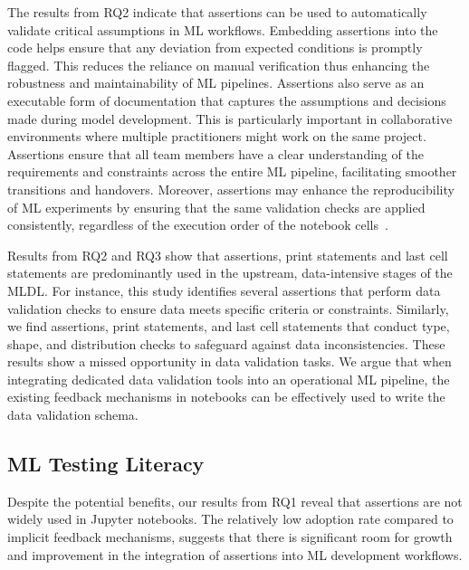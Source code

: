 \documentclass[smallextended]{svjour3}       %
\begin{document}
The results from RQ2 indicate that assertions can be used to automatically validate critical assumptions in ML workflows. Embedding assertions into the code helps ensure that any deviation from expected conditions is promptly flagged. This reduces the reliance on manual verification thus enhancing the robustness and maintainability of ML pipelines. Assertions also serve as an executable form of documentation that captures the assumptions and decisions made during model development. This is particularly important in collaborative environments where multiple practitioners might work on the same project. Assertions ensure that all team members have a clear understanding of the requirements and constraints across the entire ML pipeline, facilitating smoother transitions and handovers. Moreover, assertions may enhance the reproducibility of ML experiments by ensuring that the same validation checks are applied consistently, regardless of the execution order of the notebook cells~\citep{wang2020assessing}.

Results from RQ2 and RQ3 show that assertions, print statements and last cell statements are predominantly used in the upstream, data-intensive stages of the MLDL. For instance, this study identifies several assertions that perform data validation checks to ensure data meets specific criteria or constraints. Similarly, we find assertions, print statements, and last cell statements that conduct type, shape, and distribution checks to safeguard against data inconsistencies. These results show a missed opportunity in data validation tasks. We argue that when integrating dedicated data validation tools into an operational ML pipeline, the existing feedback mechanisms in notebooks can be effectively used to write the data validation schema.

\subsection{ML Testing Literacy}

Despite the potential benefits, our results from RQ1 reveal that assertions are not widely used in Jupyter notebooks. The relatively low adoption rate compared to implicit feedback mechanisms, suggests that there is significant room for growth and improvement in the integration of assertions into ML development workflows.
\end{document}
